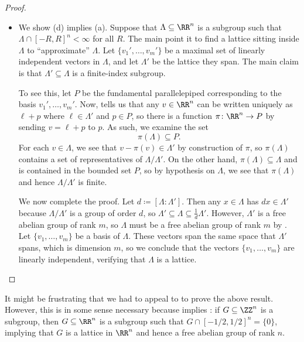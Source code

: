 \documentclass[../notes.tex]{subfiles}
\begin{document}
\begin{proof}
\begin{itemize}
		\item We show (d) implies (a). Suppose that $\Lambda\subseteq\RR^n$ is a subgroup such that $\Lambda\cap[-R,R]^n<\infty$ for all $R$. The main point it to find a lattice sitting inside $\Lambda$ to ``approximate'' $\Lambda$. Let $\{v_1',\ldots,v_m'\}$ be a maximal set of linearly independent vectors in $\Lambda$, and let $\Lambda'$ be the lattice they span. The main claim is that $\Lambda'\subseteq\Lambda$ is a finite-index subgroup.

		To see this, let $P$ be the fundamental parallelepiped corresponding to the basis $v_1',\ldots,v_m'$. Now,  tells us that any $v\in\RR^n$ can be written uniquely as $\ell+p$ where $\ell\in\Lambda'$ and $p\in P$, so there is a function $\pi\colon\RR^n\to P$ by sending $v=\ell+p$ to $p$. As such, we examine the set
		\[\pi(\Lambda)\subseteq P.\]
		For each $v\in\Lambda$, we see that $v-\pi(v)\in\Lambda'$ by construction of $\pi$, so $\pi(\Lambda)$ contains a set of representatives of $\Lambda/\Lambda'$. On the other hand, $\pi(\Lambda)\subseteq\Lambda$ and is contained in the bounded set $P$, so by hypothesis on $\Lambda$, we see that $\pi(\Lambda)$ and hence $\Lambda/\Lambda'$ is finite.

		We now complete the proof. Let $d\coloneqq[\Lambda:\Lambda']$. Then any $x\in\Lambda$ has $dx\in\Lambda'$ because $\Lambda/\Lambda'$ is a group of order $d$, so $\Lambda'\subseteq\Lambda\subseteq\frac1d\Lambda'$. However, $\Lambda'$ is a free abelian group of rank $m$, so $\Lambda$ must be a free abelian group of rank $m$ by . Let $\{v_1,\ldots,v_m\}$ be a basis of $\Lambda$. These vectors span the same space that $\Lambda'$ spans, which is dimension $m$, so we conclude that the vectors $\{v_1,\ldots,v_m\}$ are linearly independent, verifying that $\Lambda$ is a lattice.
		\qedhere
	\end{itemize}
\end{proof}
\begin{remark}
	It might be frustrating that we had to appeal to  to prove the above result. However, this is in some sense necessary because  implies : if $G\subseteq\ZZ^n$ is a subgroup, then $G\subseteq\RR^n$ is a subgroup such that $G\cap[-1/2,1/2]^n=\{0\}$, implying that $G$ is a lattice in $\RR^n$ and hence a free abelian group of rank $n$.
\end{remark}
\end{document}
